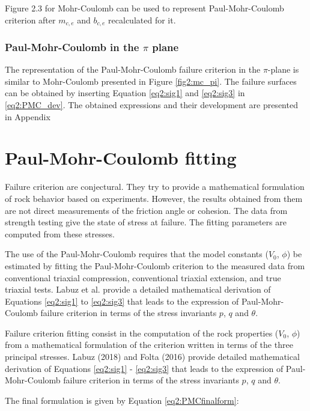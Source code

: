 Figure 2.3 for Mohr-Coulomb can be used to represent Paul-Mohr-Coulomb criterion after $m_{c,e}$ and $b_{c,e}$ recalculated for it.

\subsubsection{Paul-Mohr-Coulomb in the \texorpdfstring{$\pi$}{pi} plane}\label{ch2:PMC_pi}

The representation of the Paul-Mohr-Coulomb failure criterion in the $\pi$-plane is similar to Mohr-Coulomb presented in Figure \ref{fig2:mc_pi}. The failure surfaces can be obtained by inserting Equation \ref{eq2:sig1} and \ref{eq2:sig3} in \ref{eq2:PMC_dev}. The obtained expressions and their development are presented in Appendix %

\section{Paul-Mohr-Coulomb fitting }\label{ch2:pmcfit}

Failure criterion are conjectural. They try to provide a mathematical formulation of rock behavior based on experiments. However, the results obtained from them are not direct measurements of the friction angle or cohesion. The data from strength testing give the state of stress at failure. The fitting parameters are computed from these stresses.

The use of the Paul-Mohr-Coulomb requires that the model constants ($V_0$, $\phi$) be estimated by fitting the Paul-Mohr-Coulomb criterion to the measured data from conventional triaxial compression, conventional triaxial extension, and true triaxial tests. Labuz et al. \cite{Labuz2018} provide a detailed mathematical derivation of Equations \ref{eq2:sig1} to \ref{eq2:sig3} that leads to the expression of Paul-Mohr-Coulomb failure criterion in terms of the stress invariants $p$, $q$ and $\theta$. 

Failure criterion fitting consist in the computation of the rock properties ($V_0$, $\phi$) from a mathematical formulation of the criterion written in terms of the three principal stresses. Labuz (2018) \cite{Labuz2018} and Folta (2016) \cite{Folta2016} provide detailed mathematical derivation of Equations \ref{eq2:sig1} - \ref{eq2:sig3} that leads to the expression of Paul-Mohr-Coulomb failure criterion in terms of the stress invariants $p$, $q$  and $\theta$. 

The final formulation is given by Equation \ref{eq2:PMCfinalform}:

